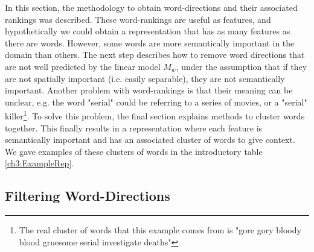 In this section, the methodology to obtain word-directions and their associated rankings was described. These word-rankings are useful as features, and hypothetically we could obtain a representation that has as many features as there are words. However, some words are more semantically important in the domain than others. The next step describes how to remove word directions that are not well predicted by the linear model $M_w$, under the assumption that if they are not spatially important (i.e. easily separable), they are not semantically important. Another problem with word-rankings is that their meaning can be unclear, e.g. the word "serial" could be referring to a series of movies, or a "serial" killer\footnote{The real cluster of words that this example comes from  is "gore gory bloody blood gruesome serial investigate deaths"}. To solve this problem, the final section explains methods to cluster words together. This finally results in a representation where each feature is semantically important and has an associated cluster of words to give context. We gave examples of these clusters of words in the introductory table \ref{ch3:ExampleRep}. %









\subsection{Filtering Word-Directions}


